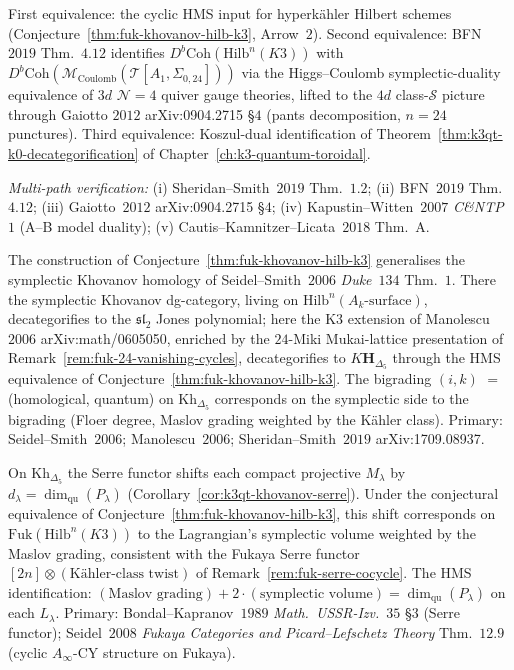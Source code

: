 \begin{remark}
First equivalence: the cyclic HMS input for hyperk\"ahler Hilbert
schemes (Conjecture~\ref{thm:fuk-khovanov-hilb-k3}, Arrow~$2$).
Second equivalence: BFN~$2019$ Thm.\ $4.12$ identifies
$D^b\mathrm{Coh}(\mathrm{Hilb}^n(K3))$ with
$D^b\mathrm{Coh}(\mathcal M_{\mathrm{Coulomb}}(\mathcal T[A_1,
\Sigma_{0,24}]))$ via the Higgs--Coulomb symplectic-duality equivalence of
$3d$ $\mathcal N = 4$ quiver gauge theories, lifted to the
$4d$ class-$\mathcal S$ picture through Gaiotto
$2012$ arXiv:0904.2715 \S $4$ (pants decomposition, $n = 24$
punctures). Third equivalence: Koszul-dual identification of
Theorem~\ref{thm:k3qt-k0-decategorification} of
Chapter~\ref{ch:k3-quantum-toroidal}.

\emph{Multi-path verification:}
(i) Sheridan--Smith~$2019$ Thm.\ $1.2$;
(ii) BFN~$2019$ Thm.\ $4.12$;
(iii) Gaiotto~$2012$ arXiv:0904.2715 \S $4$;
(iv) Kapustin--Witten~$2007$ \emph{C\&NTP}~$1$ (A--B model duality);
(v) Cautis--Kamnitzer--Licata~$2018$ Thm.\ A.
\end{remark}

\begin{remark}
\label{rem:fuk-symplectic-khovanov-precedent}
The construction of
Conjecture~\ref{thm:fuk-khovanov-hilb-k3} generalises the symplectic
Khovanov homology of Seidel--Smith~$2006$ \emph{Duke}~$134$ Thm.\ $1$.
There the symplectic Khovanov dg-category, living on
$\mathrm{Hilb}^n(A_k\text{-surface})$, decategorifies to the
$\mathfrak{sl}_2$ Jones polynomial; here the K3 extension of
Manolescu~$2006$ arXiv:math/0605050, enriched by the $24$-Miki
Mukai-lattice presentation of
Remark~\ref{rem:fuk-24-vanishing-cycles}, decategorifies to
$K\mathbf H_{\Delta_5}$ through the HMS equivalence of
Conjecture~\ref{thm:fuk-khovanov-hilb-k3}. The bigrading $(i, k)$
$=$ (homological, quantum) on $\mathrm{Kh}_{\Delta_5}$
corresponds on the symplectic side to the bigrading
(Floer degree, Maslov grading weighted by the K\"ahler class).
Primary: Seidel--Smith~$2006$; Manolescu~$2006$;
Sheridan--Smith~$2019$ arXiv:1709.08937.
\end{remark}

\begin{remark}
\label{rem:fuk-serre-gelfand-qu-dim}
On $\mathrm{Kh}_{\Delta_5}$ the Serre functor shifts each compact
projective $M_\lambda$ by $d_\lambda = \dim_{\mathrm{qu}}(P_\lambda)$
(Corollary~\ref{cor:k3qt-khovanov-serre}). Under the conjectural
equivalence of Conjecture~\ref{thm:fuk-khovanov-hilb-k3}, this shift corresponds on
$\mathrm{Fuk}(\mathrm{Hilb}^n(K3))$ to the Lagrangian's symplectic
volume weighted by the Maslov grading, consistent with the
Fukaya Serre functor $[2n]\otimes(\text{K\"ahler-class twist})$ of
Remark~\ref{rem:fuk-serre-cocycle}. The HMS identification:
$(\text{Maslov grading}) + 2\cdot(\text{symplectic volume}) =
\dim_{\mathrm{qu}}(P_\lambda)$ on each $L_\lambda$.
Primary: Bondal--Kapranov~$1989$ \emph{Math.\ USSR-Izv.}~$35$ \S $3$
(Serre functor); Seidel~$2008$ \emph{Fukaya Categories and
Picard--Lefschetz Theory} Thm.\ $12.9$ (cyclic $A_\infty$-CY
structure on Fukaya).
\end{remark}


